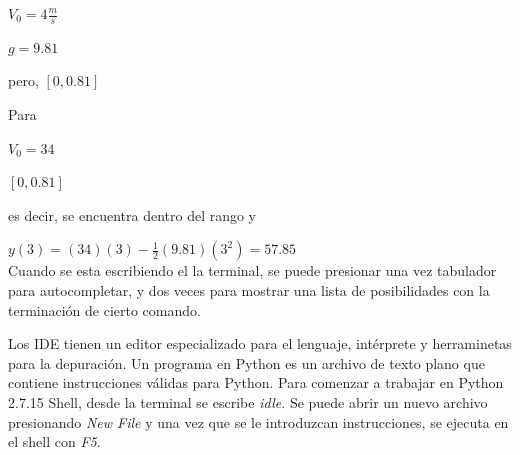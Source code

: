 \documentclass[etterpaper, 12pt, oneside]{article}%
\begin{document}
	$V_{0}=4\frac{m}{s}$
	
	$g=9.81$
	
	pero, $[0, 0.81]$
	
	Para
	
	$V_{0}=34$
	
	$[0, 0.81]$
	
	es decir, se encuentra dentro del rango y
	
	$y(3)=(34)(3)-\frac{1}{2}(9.81)(3^{2})=57.85$\\
	
	Cuando se esta escribiendo el la terminal, se puede presionar una vez tabulador para autocompletar, y dos veces para mostrar una lista de posibilidades con la terminación de cierto comando.
	
	Los IDE tienen un editor especializado para el lenguaje, intérprete y herraminetas para la depuración.	Un programa en Python es un archivo de texto plano que contiene instrucciones válidas para Python. Para comenzar a trabajar en Python 2.7.15 Shell, desde la terminal se escribe \emph{idle}. Se puede abrir un nuevo archivo presionando \emph{New File} y una vez que se le introduzcan instrucciones, se ejecuta en el shell con \emph{F5}.
	
\end{document}
